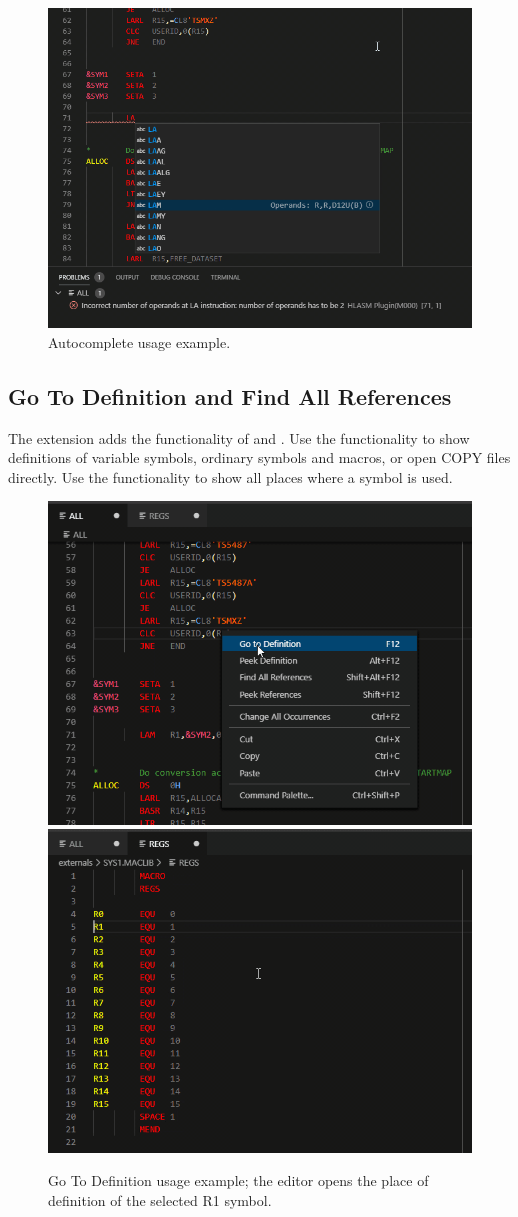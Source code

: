 \begin{figure}[H]
	\centering
	\includegraphics[width=\linewidth]{img/autocomplete/autocomplete-32}
	\caption{Autocomplete usage example.}
\end{figure}

\subsection{Go To Definition and Find All References}
The extension adds the functionality of  and . Use the  functionality to show definitions of variable symbols, ordinary symbols and macros, or open COPY files directly. Use the  functionality to show all places where a symbol is used.

\begin{figure}[H]
	\centering
	\includegraphics[width=.45\linewidth]{img/go_to_def/go_to_def-54}
	\includegraphics[width=.45\linewidth]{img/go_to_def/go_to_def-56}
	\caption{Go To Definition usage example; the editor opens the place of definition of the selected R1 symbol.}
\end{figure}

